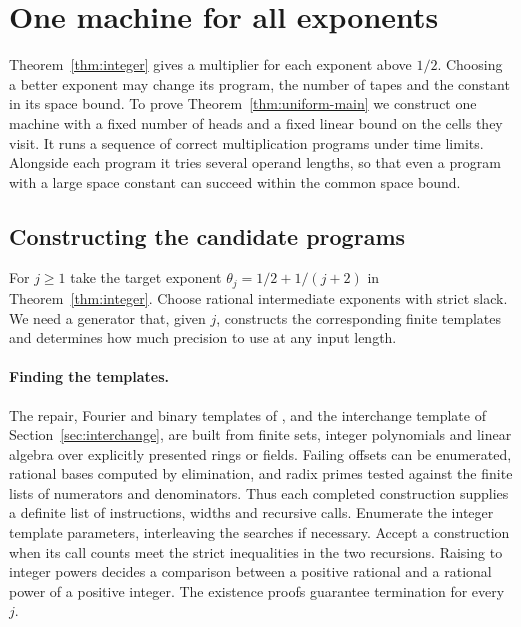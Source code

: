 \section{One machine for all exponents}\label{sec:single-machine}

Theorem~\ref{thm:integer} gives a multiplier for each exponent above
$1/2$. Choosing a better exponent may change its program, the number
of tapes and the constant in its space bound. To prove
Theorem~\ref{thm:uniform-main} we construct one machine with a fixed
number of heads and a fixed linear bound on the cells they visit.
It runs a sequence of correct multiplication programs under time
limits. Alongside each program it tries several operand lengths,
so that even a program with a large space constant can succeed
within the common space bound.

\subsection{Constructing the candidate programs}

For $j\ge1$ take the target exponent
$\theta_j=1/2+1/(j+2)$ in Theorem~\ref{thm:integer}.
Choose rational intermediate exponents with strict slack.
We need a generator that, given $j$, constructs the corresponding
finite templates and determines how much precision to use at any
input length.

\paragraph{Finding the templates.}
The repair, Fourier and binary templates of
\cite[Sections~ and~,
including Section~]{oaF}, and the interchange
template of Section~\ref{sec:interchange}, are built from finite
sets, integer polynomials and linear algebra over explicitly
presented rings or fields. Failing offsets can be enumerated,
rational bases computed by elimination, and radix primes tested
against the finite lists of numerators and denominators. Thus each
completed construction supplies a definite list of instructions,
widths and recursive calls. Enumerate the integer template
parameters, interleaving the searches if necessary. Accept a
construction when its call counts meet the strict inequalities in
the two recursions. Raising to integer powers decides a comparison
between a positive rational and a rational power of a positive
integer. The existence proofs guarantee termination for every $j$.

